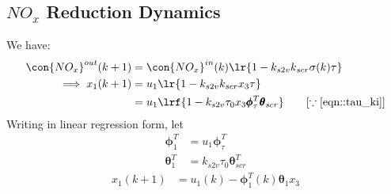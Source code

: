 \subsection{$NO_x$ Reduction Dynamics}
We have:
\begin{align*}
    \con{NO_x}^{out} (k + 1) &= \con{NO_x}^{in} (k) \lr{1 - k_{s2v} k_{scr} \sigma(k) \tau}\\
    \implies x_1 (k+1) &= u_1 \lr{1 - k_{s2v} k_{scr} x_3 \tau}\\
                       &= u_1 \lrf{1 - k_{s2v} \tau_0 x_3 \pmb \phi_\tau^T \pmb \theta_{scr}} \qquad [\because \ref{eqn::tau_ki}]
\end{align*}
Writing in linear regression form, let
\begin{align*}
    \pmb \phi_1^T &= u_1 \pmb \phi_\tau^T  \\
    \pmb \theta_1^T &= k_{s2v} \tau_0 \pmb \theta_{scr}^T
\end{align*}
\begin{align}
    x_1(k+1) &= u_1(k) - \pmb \phi_1^T (k) \pmb \theta_1 x_3  \label{eqn::nox_regression}
\end{align}
